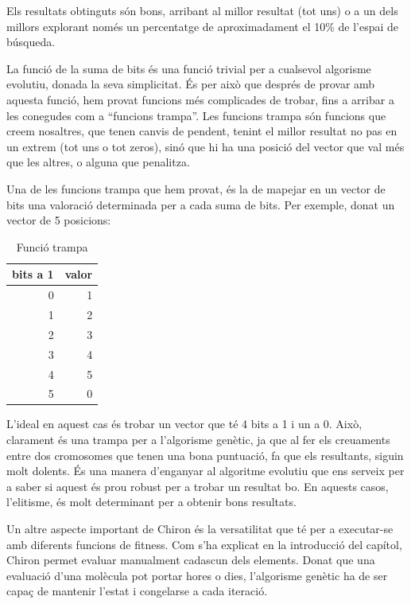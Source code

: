 \documentclass[titlepage,a4paper,12pt]{book}
\begin{document}
Els resultats obtinguts són bons, arribant al millor resultat (tot uns) o a un
dels millors explorant només un percentatge de aproximadament el  10\% de
l'espai de búsqueda.

La funció de la suma de bits és una funció trivial per a cualsevol algorisme
evolutiu, donada la seva simplicitat.  És per això que després de provar amb
aquesta funció, hem provat funcions més complicades de trobar, fins a arribar a
les conegudes com a ``funcions trampa''.  Les funcions trampa són funcions que
creem nosaltres, que tenen canvis de pendent, tenint el millor resultat no pas
en un extrem (tot uns o tot zeros), sinó que hi ha una posició del vector que
val més que les altres, o alguna que penalitza.

Una de les funcions trampa que hem provat, és la de mapejar en un vector de bits
una valoració determinada per a cada suma de bits.  Per exemple, donat un vector
de 5 posicions:


\begin{table}
\centering
\caption{Funció trampa}
\begin{tabular}{|r|r|}
\hline
\multicolumn{1}{|c|}{\textbf{bits a 1 }} & \multicolumn{1}{c|}{\textbf{ valor}} \\
\hline
\hline
0 & 1 \\
1 & 2 \\
2 & 3 \\
3 & 4 \\
4 & 5 \\
5 & 0 \\
\hline
\end{tabular}
\end{table}


L'ideal en aquest cas és trobar un vector que té 4 bits a 1 i un a 0.  Això,
clarament és una trampa per a l'algorisme genètic, ja que al fer els creuaments
entre dos cromosomes que tenen una bona puntuació, fa que els resultants, siguin
molt dolents. És una manera d'enganyar al algoritme evolutiu que ens serveix per
a saber si aquest és prou robust per a trobar un resultat bo.  En aquests casos,
l'elitisme, és molt determinant per a obtenir bons resultats.

Un altre aspecte important de Chiron és la versatilitat que té per a executar-se
amb diferents funcions de fitness.  Com s'ha explicat en la introducció del
capítol, Chiron permet evaluar manualment cadascun dels elements.  Donat que una
evaluació d'una molècula pot portar hores o dies, l'algorisme genètic ha de ser
capaç de mantenir l'estat i congelarse a cada iteració.
\end{document}
